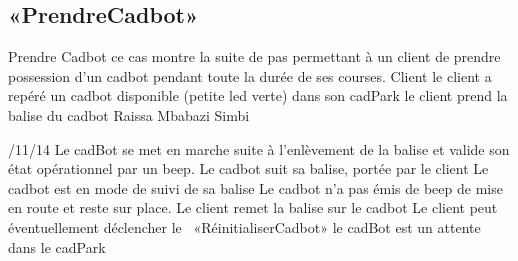 \subsection{«PrendreCadbot»}
\startCU
\nom Prendre Cadbot
\but ce cas montre la suite de pas permettant à un client de prendre possession d'un cadbot pendant toute la durée de ses courses.
\acteur Client
\precondition le client a repéré un cadbot disponible (petite led verte) dans son cadPark
\declenchement le client prend la balise du cadbot
\auteur Raissa Mbabazi Simbi
\date 7/11/14
\nominal %
\startnominal
\etape [PC:SE1] Le cadBot se met en marche suite à l'enlèvement de la balise et valide son état opérationnel par un beep.
\etape Le cadbot suit sa balise, portée par le client
\stopnominal
\postcondition Le cadbot est en mode de suivi de sa balise
\exception
\startalternatif[PC:SE1] %
\etape Le cadbot n'a pas émis de beep de mise en route et reste sur place.
\etape Le client remet la balise sur le cadbot
\etape Le client peut éventuellement déclencher le \cu\ «RéinitialiserCadbot»
\stopcondition
\postcondition le cadBot est un attente dans le cadPark
\stopalternatif
\stopCU

